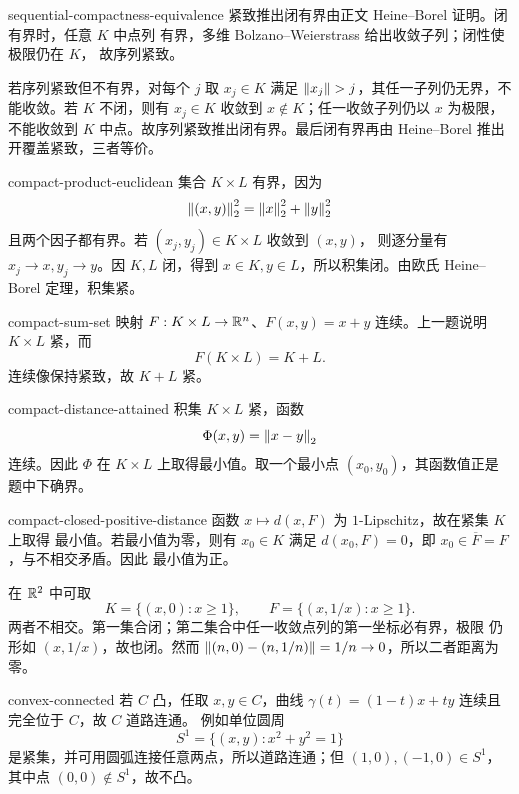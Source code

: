 \begin{solution}{sequential-compactness-equivalence}
紧致推出闭有界由正文 Heine--Borel 证明。闭有界时，任意 \(K\) 中点列
有界，多维 Bolzano--Weierstrass 给出收敛子列；闭性使极限仍在 \(K\)，
故序列紧致。

若序列紧致但不有界，对每个 \(j\) 取 \(x_j\in K\) 满足
\(\left\lVert x_j\right\rVert>j\)，其任一子列仍无界，不能收敛。若 \(K\) 不闭，则有
\(x_j\in K\) 收敛到 \(x\notin K\)；任一收敛子列仍以 \(x\) 为极限，
不能收敛到 \(K\) 中点。故序列紧致推出闭有界。最后闭有界再由
Heine--Borel 推出开覆盖紧致，三者等价。
\end{solution}

\begin{solution}{compact-product-euclidean}
集合 \(K\times L\) 有界，因为
\[
 \left\lVert(x,y)\right\rVert_2^2=\left\lVert x\right\rVert_2^2+\left\lVert y\right\rVert_2^2
\]
且两个因子都有界。若 \((x_j,y_j)\in K\times L\) 收敛到 \((x,y)\)，
则逐分量有 \(x_j\to x,y_j\to y\)。因 \(K,L\) 闭，得到
\(x\in K,y\in L\)，所以积集闭。由欧氏 Heine--Borel 定理，积集紧。
\end{solution}

\begin{solution}{compact-sum-set}
映射 \(F:K\times L\to\mathbb{R}^n\)、\(F(x,y)=x+y\) 连续。上一题说明
\(K\times L\) 紧，而
\[
 F(K\times L)=K+L.
\]
连续像保持紧致，故 \(K+L\) 紧。
\end{solution}

\begin{solution}{compact-distance-attained}
积集 \(K\times L\) 紧，函数
\[
 \Phi(x,y)=\left\lVert x-y\right\rVert_2
\]
连续。因此 \(\Phi\) 在 \(K\times L\) 上取得最小值。取一个最小点
\((x_0,y_0)\)，其函数值正是题中下确界。
\end{solution}

\begin{solution}{compact-closed-positive-distance}
函数 \(x\mapsto d(x,F)\) 为 \(1\)-Lipschitz，故在紧集 \(K\) 上取得
最小值。若最小值为零，则有 \(x_0\in K\) 满足
\(d(x_0,F)=0\)，即 \(x_0\in\overline F=F\)，与不相交矛盾。因此
最小值为正。

在 \(\mathbb{R}^2\) 中可取
\[
 K=\{(x,0):x\ge1\},\qquad
 F=\{(x,1/x):x\ge1\}.
\]
两者不相交。第一集合闭；第二集合中任一收敛点列的第一坐标必有界，极限
仍形如 \((x,1/x)\)，故也闭。然而
\(\left\lVert(n,0)-(n,1/n)\right\rVert=1/n\to0\)，所以二者距离为零。
\end{solution}

\begin{solution}{convex-connected}
若 \(C\) 凸，任取 \(x,y\in C\)，曲线
\(\gamma(t)=(1-t)x+ty\) 连续且完全位于 \(C\)，故 \(C\) 道路连通。
例如单位圆周
\[
 S^1=\{(x,y):x^2+y^2=1\}
\]
是紧集，并可用圆弧连接任意两点，所以道路连通；但
\((1,0),(-1,0)\in S^1\)，其中点 \((0,0)\notin S^1\)，故不凸。
\end{solution}

